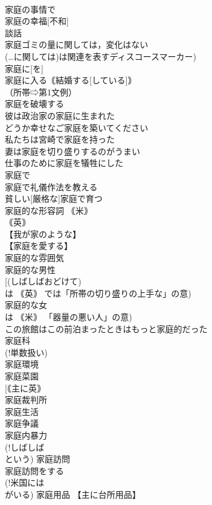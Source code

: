 \documentclass[8pt]{extreport}
\begin{document}
\begin{CJK}{UTF8}{min}
\\	家庭の事情で 
\\	家庭の幸福[不和] 
\\	談話 
\\	家庭ゴミの量に関しては，変化はない 
\\	(…に関しては)は関連を表すディスコースマーカー) 
\\	家庭に[を] 
\\	家庭に入る｟結婚する[している]｠ 
\\	（所帯⇨第1文例） 
\\	家庭を破壊する 
\\	彼は政治家の家庭に生まれた 
\\	どうか幸せなご家庭を築いてください 
\\	私たちは宮崎で家庭を持った 
\\	妻は家庭を切り盛りするのがうまい 
\\	仕事のために家庭を犠牲にした 
\\	家庭で 
\\	家庭で礼儀作法を教える 
\\	貧しい[厳格な]家庭で育つ 
\\	家庭的な形容詞 ｟米｠
\\	｟英｠ 
\\	【我が家のような】
\\	【家庭を愛する】
\\	家庭的な雰囲気 
\\	家庭的な男性 
\\	[(しばしばおどけて) 
\\	は ｟英｠ では「所帯の切り盛りの上手な」の意) 
\\	家庭的な女 
\\	は ｟米｠ 「器量の悪い人」の意) 
\\	この旅館はこの前泊まったときはもっと家庭的だった 
\\	家庭科 
\\	(!単数扱い) 
\\	家庭環境 
\\	家庭菜園 
\\	[｟主に英｠ 
\\	家庭裁判所 
\\	家庭生活 
\\	家庭争議 
\\	家庭内暴力 
\\	(!しばしば 
\\	という) 家庭訪問 
\\	家庭訪問をする 
\\	(!米国には 
\\	がいる) 家庭用品 【主に台所用品】

\end{CJK}
\end{document}
